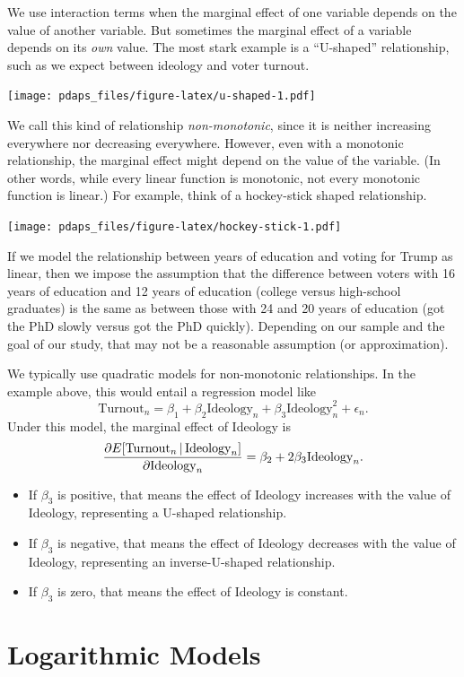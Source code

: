 \documentclass[12pt,oneside,openany]{book}
\begin{document}
We use interaction terms when the marginal effect of one variable
depends on the value of another variable. But sometimes the marginal
effect of a variable depends on its \emph{own} value. The most stark
example is a ``U-shaped'' relationship, such as we expect between
ideology and voter turnout.

\texttt{[image: pdaps\_files/figure-latex/u-shaped-1.pdf]}

We call this kind of relationship \emph{non-monotonic}, since it is
neither increasing everywhere nor decreasing everywhere. However, even
with a monotonic relationship, the marginal effect might depend on the
value of the variable. (In other words, while every linear function is
monotonic, not every monotonic function is linear.) For example, think
of a hockey-stick shaped relationship.

\texttt{[image: pdaps\_files/figure-latex/hockey-stick-1.pdf]}

If we model the relationship between years of education and voting for
Trump as linear, then we impose the assumption that the difference
between voters with 16 years of education and 12 years of education
(college versus high-school graduates) is the same as between those with
24 and 20 years of education (got the PhD slowly versus got the PhD
quickly). Depending on our sample and the goal of our study, that may
not be a reasonable assumption (or approximation).

We typically use quadratic models for non-monotonic relationships. In
the example above, this would entail a regression model like \[
\text{Turnout}_n = \beta_1 + \beta_2 \text{Ideology}_n + \beta_3 \text{Ideology}_n^2 + \epsilon_n.
\] Under this model, the marginal effect of Ideology is \[
\frac{\partial{}E[\text{Turnout}_n \,|\, \text{Ideology}_n]}{\partial{}\text{Ideology}_n}
= \beta_2 + 2 \beta_3 \text{Ideology}_n.
\]

\begin{itemize}
\item
  If \(\beta_3\) is positive, that means the effect of Ideology
  increases with the value of Ideology, representing a U-shaped
  relationship.
\item
  If \(\beta_3\) is negative, that means the effect of Ideology
  decreases with the value of Ideology, representing an inverse-U-shaped
  relationship.
\item
  If \(\beta_3\) is zero, that means the effect of Ideology is constant.
\end{itemize}

\section{Logarithmic Models}\label{logarithmic-models}
\end{document}

